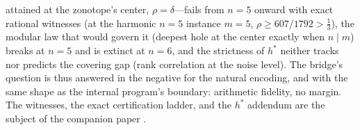 \begin{enumerate}[leftmargin=1.7em,itemsep=4pt]
  attained at the zonotope's center, $\rho=\delta$---fails from $n=5$
  onward with exact rational witnesses (at the harmonic $n=5$ instance
  $m=5$, $\rho\ge 607/1792>\tfrac13$), the modular law that would
  govern it (deepest hole at the center exactly when $n\mid m$) breaks
  at $n=5$ and is extinct at $n=6$, and the strictness of $h^*$ neither
  tracks nor predicts the covering gap (rank correlation at the noise
  level). The bridge's question is thus answered in the negative for
  the natural encoding, and with the same shape as the internal
  program's boundary: arithmetic fidelity, no margin. The witnesses,
  the exact certification ladder, and the $h^*$ addendum are the
  subject of the companion paper \cite{companion-paper}.
\end{enumerate}
